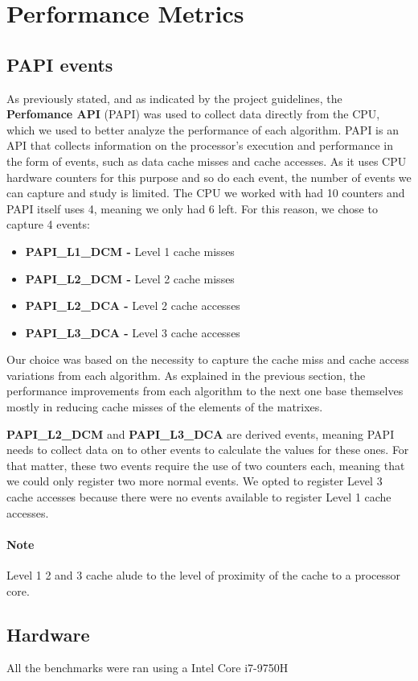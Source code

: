 \section{Performance Metrics}

\subsection{PAPI events}

As previously stated, and as indicated by the project guidelines, the \textbf{Perfomance API} (PAPI) was used to collect data directly from the CPU, which we used to better analyze the performance of each algorithm. 
PAPI is an API that collects information on the processor's execution and performance in the form of events, such as data cache misses and cache accesses. As it uses CPU hardware counters for this purpose and so do each event, the number of events we can capture and study is limited. The CPU we worked with had 10 counters and PAPI itself uses 4, meaning we only had 6 left. 
For this reason, we chose to capture 4 events:

\begin{itemize}
    \item \textbf{PAPI\_L1\_DCM - } Level 1 cache misses
    \item \textbf{PAPI\_L2\_DCM - } Level 2 cache misses
    \item \textbf{PAPI\_L2\_DCA - } Level 2 cache accesses
    \item \textbf{PAPI\_L3\_DCA - } Level 3 cache accesses
\end{itemize}

Our choice was based on the necessity to capture the cache miss and cache access variations from each algorithm. As explained in the previous section, the performance improvements from each algorithm to the next one base themselves mostly in reducing cache misses of the elements of the matrixes. 

\textbf{PAPI\_L2\_DCM} and \textbf{PAPI\_L3\_DCA} are derived events, meaning PAPI needs to collect data on to other events to calculate the values for these ones. For that matter, these two events require the use of two counters each, meaning that we could only register two more normal events. We opted to register Level 3 cache accesses because there were no events available to register Level 1 cache accesses. 

\paragraph{Note} Level 1 2 and 3 cache alude to the level of proximity of the cache to a processor core. 

\subsection{Hardware}
All the benchmarks were ran using a Intel Core i7-9750H